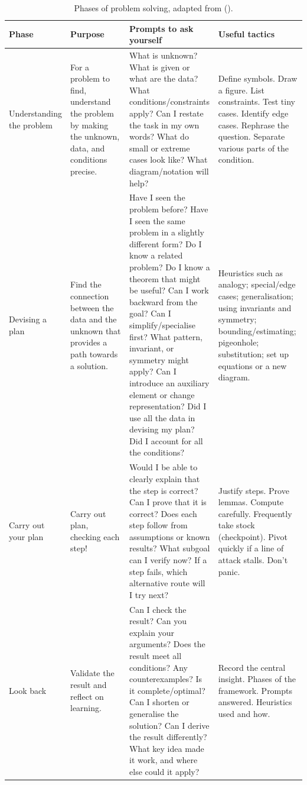 \documentclass[
  a4paper,
  DIV=11,
  numbers=noendperiod,
  oneside]{scrreprt}
\begin{document}
\begin{landscape}

\begin{longtable}[t]{p{0.18\linewidth}p{0.22\linewidth}p{0.30\linewidth}p{0.30\linewidth}}

\caption{\label{tbl-phases}Phases of problem solving, adapted from
().}

\tabularnewline

\toprule
Phase & Purpose & Prompts to ask yourself & Useful tactics\\
\midrule
Understanding the problem & For a problem to find, understand the problem by making the unknown, data, and conditions precise. & What is unknown? What is given or what are the data? What conditions/constraints apply? Can I restate the task in my own words? What do small or extreme cases look like? What diagram/notation will help? & Define symbols. Draw a figure. List constraints. Test tiny cases. Identify edge cases. Rephrase the question. Separate various parts of the condition.\\
Devising a plan & Find the connection between the data and the unknown that provides a path towards a solution. & Have I seen the problem before? Have I seen the same problem in a slightly different form? Do I know a related problem? Do I know a theorem that might be useful? Can I work backward from the goal? Can I simplify/specialise first? What pattern, invariant, or symmetry might apply? Can I introduce an auxiliary element or change representation? Did I use all the data in devising my plan? Did I account for all the conditions? & Heuristics such as analogy; special/edge cases; generalisation; using invariants and symmetry; bounding/estimating; pigeonhole; substitution; set up equations or a new diagram.\\
Carry out your plan & Carry out plan, checking each step! & Would I be able to clearly explain that the step is correct? Can I prove that it is correct? Does each step follow from assumptions or known results? What subgoal can I verify now? If a step fails, which alternative route will I try next? & Justify steps. Prove lemmas. Compute carefully. Frequently take stock (checkpoint). Pivot quickly if a line of attack stalls. Don't panic.\\
Look back & Validate the result and reflect on learning. & Can I check the result? Can you explain your arguments? Does the result meet all conditions? Any counterexamples? Is it complete/optimal? Can I shorten or generalise the solution? Can I derive the result differently? What key idea made it work, and where else could it apply? & Record the central insight. Phases of the framework. Prompts answered. Heuristics used and how.\\
\bottomrule

\end{longtable}

\end{landscape}
\end{document}
